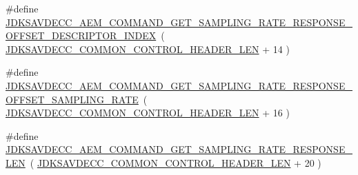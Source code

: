 \begin{DoxyCompactItemize}
\item 
\#define \hyperlink{group__command__get__sampling__rate__response_gabe500c46d8e13754810212a8bccc4430}{J\+D\+K\+S\+A\+V\+D\+E\+C\+C\+\_\+\+A\+E\+M\+\_\+\+C\+O\+M\+M\+A\+N\+D\+\_\+\+G\+E\+T\+\_\+\+S\+A\+M\+P\+L\+I\+N\+G\+\_\+\+R\+A\+T\+E\+\_\+\+R\+E\+S\+P\+O\+N\+S\+E\+\_\+\+O\+F\+F\+S\+E\+T\+\_\+\+D\+E\+S\+C\+R\+I\+P\+T\+O\+R\+\_\+\+I\+N\+D\+EX}~( \hyperlink{group__jdksavdecc__avtp__common__control__header_gaae84052886fb1bb42f3bc5f85b741dff}{J\+D\+K\+S\+A\+V\+D\+E\+C\+C\+\_\+\+C\+O\+M\+M\+O\+N\+\_\+\+C\+O\+N\+T\+R\+O\+L\+\_\+\+H\+E\+A\+D\+E\+R\+\_\+\+L\+EN} + 14 )
\item 
\#define \hyperlink{group__command__get__sampling__rate__response_ga8826ab43e3ef21d85d25e78ba00a0c52}{J\+D\+K\+S\+A\+V\+D\+E\+C\+C\+\_\+\+A\+E\+M\+\_\+\+C\+O\+M\+M\+A\+N\+D\+\_\+\+G\+E\+T\+\_\+\+S\+A\+M\+P\+L\+I\+N\+G\+\_\+\+R\+A\+T\+E\+\_\+\+R\+E\+S\+P\+O\+N\+S\+E\+\_\+\+O\+F\+F\+S\+E\+T\+\_\+\+S\+A\+M\+P\+L\+I\+N\+G\+\_\+\+R\+A\+TE}~( \hyperlink{group__jdksavdecc__avtp__common__control__header_gaae84052886fb1bb42f3bc5f85b741dff}{J\+D\+K\+S\+A\+V\+D\+E\+C\+C\+\_\+\+C\+O\+M\+M\+O\+N\+\_\+\+C\+O\+N\+T\+R\+O\+L\+\_\+\+H\+E\+A\+D\+E\+R\+\_\+\+L\+EN} + 16 )
\item 
\#define \hyperlink{group__command__get__sampling__rate__response_gaa68b20c394463c3612347393cb4cddd2}{J\+D\+K\+S\+A\+V\+D\+E\+C\+C\+\_\+\+A\+E\+M\+\_\+\+C\+O\+M\+M\+A\+N\+D\+\_\+\+G\+E\+T\+\_\+\+S\+A\+M\+P\+L\+I\+N\+G\+\_\+\+R\+A\+T\+E\+\_\+\+R\+E\+S\+P\+O\+N\+S\+E\+\_\+\+L\+EN}~( \hyperlink{group__jdksavdecc__avtp__common__control__header_gaae84052886fb1bb42f3bc5f85b741dff}{J\+D\+K\+S\+A\+V\+D\+E\+C\+C\+\_\+\+C\+O\+M\+M\+O\+N\+\_\+\+C\+O\+N\+T\+R\+O\+L\+\_\+\+H\+E\+A\+D\+E\+R\+\_\+\+L\+EN} + 20 )
\end{DoxyCompactItemize}
